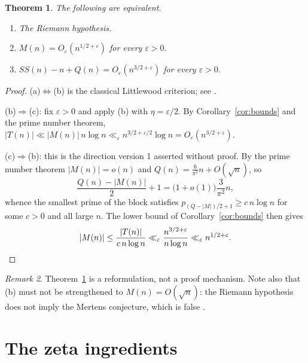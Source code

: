\documentclass[11pt]{amsart}
\numberwithin{equation}{section}
\theoremstyle{plain}
\newtheorem{theorem}{Theorem}[section]
\theoremstyle{definition}
\theoremstyle{remark}
\newtheorem{remark}[theorem]{Remark}
\newcommand{\Mert}{M}
\newcommand{\Sq}{Q}
\begin{document}
\begin{theorem}\label{thm:RH}
The following are equivalent.
\begin{enumerate}[label=(\alph*)]
\item The Riemann hypothesis.
\item $\Mert(n)=O_\varepsilon(n^{1/2+\varepsilon})$ for every $\varepsilon>0$.
\item $SS(n)-n+\Sq(n)=O_\varepsilon(n^{3/2+\varepsilon})$ for every
$\varepsilon>0$.
\end{enumerate}
\end{theorem}

\begin{proof}
(a)$\iff$(b) is the classical Littlewood criterion; see \cite{Titchmarsh1986}.

(b)$\Rightarrow$(c): fix $\varepsilon>0$ and apply (b) with
$\eta=\varepsilon/2$. By Corollary~\ref{cor:bounds} and the prime number theorem,
$|T(n)|\ll |\Mert(n)|\,n\log n\ll_{\varepsilon}
 n^{3/2+\varepsilon/2}\log n=O_{\varepsilon}(n^{3/2+\varepsilon})$.

(c)$\Rightarrow$(b): this is the direction version 1 asserted without proof. By
the prime number theorem $|\Mert(n)|=o(n)$ and $\Sq(n)=\tfrac6{\pi^2}n+O(\sqrt
n)$, so
\begin{equation}
\label{eq:smallest-block-index}
\frac{\Sq(n)-|\Mert(n)|}{2}+1=\bigl(1+o(1)\bigr)\frac{3}{\pi^2}n ,
\end{equation}
whence the smallest prime of the block satisfies
$p_{(\Sq-|\Mert|)/2+1}\ge c\,n\log n$ for some $c>0$ and all large $n$. The
lower bound of Corollary~\ref{cor:bounds} then gives
\begin{equation}
\label{eq:reverse-mertens-bound}
|\Mert(n)|\le \frac{|T(n)|}{c\,n\log n}
\ll_\varepsilon \frac{n^{3/2+\varepsilon}}{n\log n}
\ll_\varepsilon n^{1/2+\varepsilon}. \qedhere
\end{equation}
\end{proof}

\begin{remark}
\label{rem:rh-reformulation}
Theorem~\ref{thm:RH} is a reformulation, not a proof mechanism. Note also that
(b) must not be strengthened to $\Mert(n)=O(\sqrt n)$: the Riemann hypothesis
does not imply the Mertens conjecture, which is false \cite{OdlyzkoTeRiele1985}.
\end{remark}

\section{The zeta ingredients}
\label{sec:zeta-ingredients}
\end{document}
